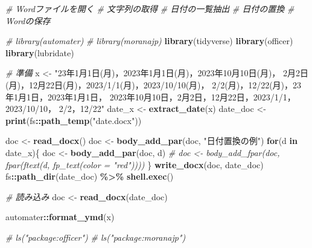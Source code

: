 \documentclass[
]{article}
\newenvironment{Shaded}{\begin{snugshade}}{\end{snugshade}}
\newcommand{\CommentTok}[1]{\textcolor[rgb]{0.56,0.35,0.01}{\textit{#1}}}
\newcommand{\ControlFlowTok}[1]{\textcolor[rgb]{0.13,0.29,0.53}{\textbf{#1}}}
\newcommand{\FunctionTok}[1]{\textcolor[rgb]{0.13,0.29,0.53}{\textbf{#1}}}
\newcommand{\NormalTok}[1]{#1}
\newcommand{\OtherTok}[1]{\textcolor[rgb]{0.56,0.35,0.01}{#1}}
\newcommand{\SpecialCharTok}[1]{\textcolor[rgb]{0.81,0.36,0.00}{\textbf{#1}}}
\newcommand{\StringTok}[1]{\textcolor[rgb]{0.31,0.60,0.02}{#1}}
\begin{document}
\begin{Shaded}
\begin{Highlighting}[]
  \CommentTok{\# Wordファイルを開く}
  \CommentTok{\# 文字列の取得}
  \CommentTok{\# 日付の一覧抽出}
  \CommentTok{\# 日付の置換}
  \CommentTok{\# Wordの保存}

  \CommentTok{\# library(automater)}
  \CommentTok{\# library(moranajp)}
\FunctionTok{library}\NormalTok{(tidyverse)}
\FunctionTok{library}\NormalTok{(officer)}
\FunctionTok{library}\NormalTok{(lubridate)}

  \CommentTok{\# 準備}
\NormalTok{x }\OtherTok{\textless{}{-}} 
  \StringTok{"23年1月1日(月)，2023年1月1日(月)，2023年10月10日(月)，}
\StringTok{  2月2日(月)，12月22日(月)，2023/1/1(月)，2023/10/10(月)，}
\StringTok{  2/2(月)，12/22(月)，23年1月1日，2023年1月1日，}
\StringTok{  2023年10月10日，2月2日，12月22日，2023/1/1，2023/10/10，}
\StringTok{  2/2，12/22"}
\NormalTok{date\_x }\OtherTok{\textless{}{-}} \FunctionTok{extract\_date}\NormalTok{(x)}
\NormalTok{date\_doc }\OtherTok{\textless{}{-}} \FunctionTok{print}\NormalTok{(fs}\SpecialCharTok{::}\FunctionTok{path\_temp}\NormalTok{(}\StringTok{"date.docx"}\NormalTok{))}

\NormalTok{doc }\OtherTok{\textless{}{-}} \FunctionTok{read\_docx}\NormalTok{()}
\NormalTok{doc }\OtherTok{\textless{}{-}} \FunctionTok{body\_add\_par}\NormalTok{(doc, }\StringTok{"日付置換の例"}\NormalTok{)}
\ControlFlowTok{for}\NormalTok{(d }\ControlFlowTok{in}\NormalTok{ date\_x)\{}
\NormalTok{  doc }\OtherTok{\textless{}{-}} \FunctionTok{body\_add\_par}\NormalTok{(doc, d)}
  \CommentTok{\#   doc \textless{}{-} body\_add\_fpar(doc, fpar(ftext(d, fp\_text(color = "red"))))}
\NormalTok{\}}
\FunctionTok{write\_docx}\NormalTok{(doc, date\_doc)}
\NormalTok{fs}\SpecialCharTok{::}\FunctionTok{path\_dir}\NormalTok{(date\_doc) }\SpecialCharTok{\%\textgreater{}\%}
  \FunctionTok{shell.exec}\NormalTok{()}

  \CommentTok{\# 読み込み}
\NormalTok{doc }\OtherTok{\textless{}{-}} \FunctionTok{read\_docx}\NormalTok{(date\_doc)}


\NormalTok{automater}\SpecialCharTok{::}\FunctionTok{format\_ymd}\NormalTok{(x)}

  \CommentTok{\# ls("package:officer")}
  \CommentTok{\# ls("package:moranajp")}
\end{Highlighting}
\end{Shaded}
\end{document}
